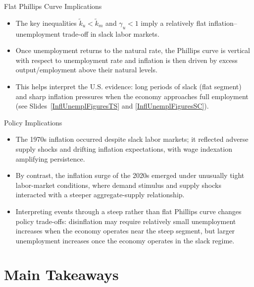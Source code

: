 \documentclass[11pt,aspectratio=169]{beamer}
\begin{document}
\begin{frame}{Flat Phillips Curve Implications}
\small
\begin{itemize}
    \item The key inequalities \(\tilde k_u<\tilde k_m\) and \(\gamma_u<1\) imply a relatively flat inflation--unemployment trade-off in slack labor markets.
    \item Once unemployment returns to the natural rate, the Phillips curve is vertical with respect to unemployment rate and inflation is then driven by excess output/employment above their natural levels.
    \item This helps interpret the U.S. evidence: long periods of slack (flat segment) and sharp inflation pressures when the economy approaches full employment (see Slides~\ref{InflUnemplFiguresTS} and \ref{InflUnemplFiguresSC}).
\end{itemize}
\end{frame}

\begin{frame}{Policy Implications}
\small
\begin{itemize}
\item The 1970s inflation occurred despite slack labor markets; it reflected adverse supply shocks and drifting inflation expectations, with wage indexation amplifying persistence.
\item By contrast, the inflation surge of the 2020s emerged under unusually tight labor-market conditions, where demand stimulus and supply shocks interacted with a steeper aggregate-supply relationship.
\item Interpreting events through a steep rather than flat Phillips curve changes policy trade-offs: disinflation may require relatively small unemployment increases when the economy operates near the steep segment, but larger unemployment increases once the economy operates in the slack regime.
\end{itemize}
\end{frame}


\section{Main Takeaways}
\end{document}
